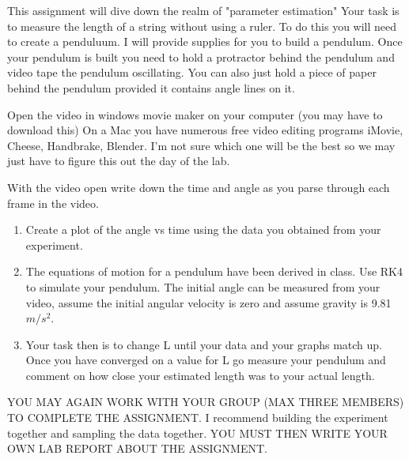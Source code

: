 This assignment will dive down the realm of "parameter estimation" 
Your task is to measure the length of a string without using a
ruler. To do this you will need to create a penduluum. I will provide
supplies for you to build a pendulum. Once your pendulum is built you
need to hold a protractor behind the pendulum and video tape the
pendulum oscillating. You can also just hold a piece of paper behind
the pendulum provided it contains angle lines on it.  

Open the video in windows movie maker on your computer (you may have
to download this) On a Mac you have numerous free video editing
programs iMovie, Cheese, Handbrake, Blender. I'm not sure which one
will be the best so we may just have to figure this out the day of the
lab. 

With the video open write down the time and angle as you parse through
each frame in the video. 

\begin{enumerate}
  
\item Create a plot of the angle vs time using the data you obtained
  from your experiment. 

\item  The equations of motion for a pendulum have been derived in
  class. Use RK4 to simulate your pendulum. The initial angle can be
  measured from your video, assume the initial angular velocity is
  zero and assume gravity is 9.81 $m/s^2$. 

\item Your task then is to change L until your data and your graphs
  match up. Once you have converged on a value for L go measure your
  pendulum and comment on how close your estimated length was to your
  actual length.  

\end{enumerate}

YOU MAY AGAIN WORK WITH YOUR GROUP (MAX THREE MEMBERS) TO COMPLETE THE
ASSIGNMENT. I recommend building the experiment together and sampling
the data together. YOU MUST THEN WRITE YOUR OWN LAB REPORT ABOUT THE
ASSIGNMENT.  

